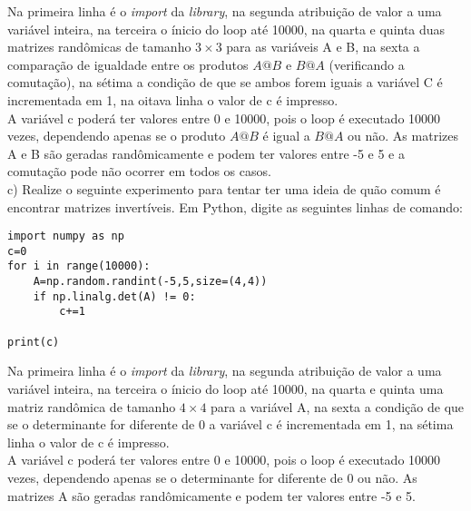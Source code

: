 Na primeira linha é o \textit{import} da \textit{library}, na segunda atribuição de valor a uma variável inteira, na terceira o ínicio do loop até 10000, na quarta e quinta duas matrizes randômicas de tamanho $3\times 3$ para as variáveis A e B, na sexta a comparação de igualdade entre os produtos $A@B$ e $B@A$ (verificando a comutação), na sétima a condição de que se ambos forem iguais a variável C é incrementada em 1, na oitava linha o valor de c é impresso.
\\

\textcolor{COLOR2}{A variável c poderá ter valores entre 0 e 10000, pois o loop é executado 10000 vezes, dependendo apenas se o produto $A@B$ é igual a $B@A$ ou não. As matrizes A e B são geradas randômicamente e podem ter valores entre -5 e 5 e a comutação pode não ocorrer em todos os casos.}
\\

c) Realize o seguinte experimento para tentar ter uma ideia de quão comum é encontrar matrizes invertíveis. Em Python, digite as seguintes linhas de comando:
\\

\begin{lstlisting}
import numpy as np
c=0
for i in range(10000):
    A=np.random.randint(-5,5,size=(4,4))
    if np.linalg.det(A) != 0:
        c+=1

print(c)
\end{lstlisting}

Na primeira linha é o \textit{import} da \textit{library}, na segunda atribuição de valor a uma variável inteira, na terceira o ínicio do loop até 10000, na quarta e quinta uma matriz randômica de tamanho $4\times 4$ para a variável A, na sexta a condição de que se o determinante for diferente de 0 a variável c é incrementada em 1, na sétima linha o valor de c é impresso.
\\

\textcolor{COLOR2}{A variável c poderá ter valores entre 0 e 10000, pois o loop é executado 10000 vezes, dependendo apenas se o determinante for diferente de 0 ou não. As matrizes A são geradas randômicamente e podem ter valores entre -5 e 5.}
\\